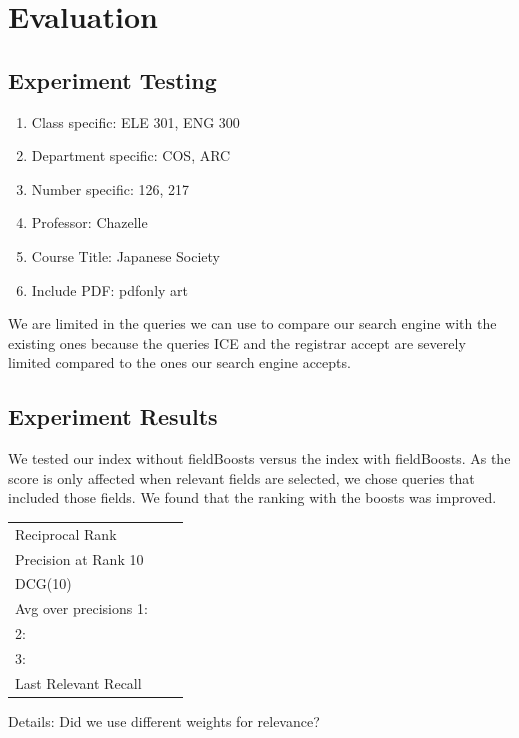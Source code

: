 \documentclass[12pt,letterpaper]{article}
\begin{document}
\section{Evaluation}
\subsection{Experiment Testing}
\begin{enumerate}
\item Class specific: ELE 301, ENG 300
\item Department specific: COS, ARC
\item Number specific: 126, 217
\item Professor: Chazelle
\item Course Title: Japanese Society
\item Include PDF: pdfonly art
\end{enumerate}

We are limited in the queries we can use to compare our search engine with the existing ones because the queries ICE and the registrar accept are severely limited compared to the ones our search engine accepts.
\subsection{Experiment Results}

We tested our index without fieldBoosts versus the index with fieldBoosts. As the score is only affected when relevant fields are selected, we chose queries that included those fields. We found that the ranking with the boosts was improved. 

\begin{tabular}{ | l | c | r |}
	Reciprocal Rank & & \\
	Precision at Rank 10 & & \\
	DCG(10) & & \\
	Avg over precisions 1: & & \\
	2: & & \\
	3: & & \\
	Last Relevant Recall & & \\
\end{tabular}
Details: Did we use different weights for relevance?
\end{document}
